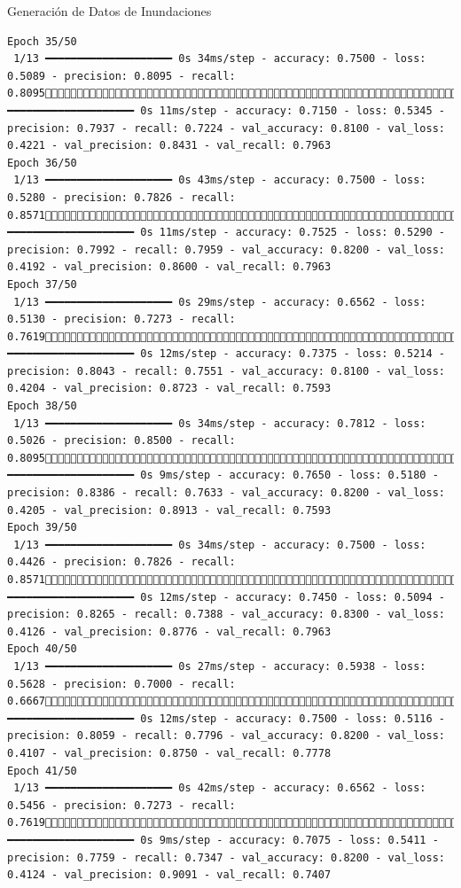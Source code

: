 \documentclass[
  ignorenonframetext,
]{beamer}
\begin{document}
\begin{frame}[fragile]{Generación de Datos de Inundaciones}
\begin{verbatim}
Epoch 35/50
 1/13 ━━━━━━━━━━━━━━━━━━━━ 0s 34ms/step - accuracy: 0.7500 - loss: 0.5089 - precision: 0.8095 - recall: 0.809513/13 ━━━━━━━━━━━━━━━━━━━━ 0s 11ms/step - accuracy: 0.7150 - loss: 0.5345 - precision: 0.7937 - recall: 0.7224 - val_accuracy: 0.8100 - val_loss: 0.4221 - val_precision: 0.8431 - val_recall: 0.7963
Epoch 36/50
 1/13 ━━━━━━━━━━━━━━━━━━━━ 0s 43ms/step - accuracy: 0.7500 - loss: 0.5280 - precision: 0.7826 - recall: 0.857113/13 ━━━━━━━━━━━━━━━━━━━━ 0s 11ms/step - accuracy: 0.7525 - loss: 0.5290 - precision: 0.7992 - recall: 0.7959 - val_accuracy: 0.8200 - val_loss: 0.4192 - val_precision: 0.8600 - val_recall: 0.7963
Epoch 37/50
 1/13 ━━━━━━━━━━━━━━━━━━━━ 0s 29ms/step - accuracy: 0.6562 - loss: 0.5130 - precision: 0.7273 - recall: 0.761913/13 ━━━━━━━━━━━━━━━━━━━━ 0s 12ms/step - accuracy: 0.7375 - loss: 0.5214 - precision: 0.8043 - recall: 0.7551 - val_accuracy: 0.8100 - val_loss: 0.4204 - val_precision: 0.8723 - val_recall: 0.7593
Epoch 38/50
 1/13 ━━━━━━━━━━━━━━━━━━━━ 0s 34ms/step - accuracy: 0.7812 - loss: 0.5026 - precision: 0.8500 - recall: 0.809513/13 ━━━━━━━━━━━━━━━━━━━━ 0s 9ms/step - accuracy: 0.7650 - loss: 0.5180 - precision: 0.8386 - recall: 0.7633 - val_accuracy: 0.8200 - val_loss: 0.4205 - val_precision: 0.8913 - val_recall: 0.7593
Epoch 39/50
 1/13 ━━━━━━━━━━━━━━━━━━━━ 0s 34ms/step - accuracy: 0.7500 - loss: 0.4426 - precision: 0.7826 - recall: 0.857113/13 ━━━━━━━━━━━━━━━━━━━━ 0s 12ms/step - accuracy: 0.7450 - loss: 0.5094 - precision: 0.8265 - recall: 0.7388 - val_accuracy: 0.8300 - val_loss: 0.4126 - val_precision: 0.8776 - val_recall: 0.7963
Epoch 40/50
 1/13 ━━━━━━━━━━━━━━━━━━━━ 0s 27ms/step - accuracy: 0.5938 - loss: 0.5628 - precision: 0.7000 - recall: 0.666713/13 ━━━━━━━━━━━━━━━━━━━━ 0s 12ms/step - accuracy: 0.7500 - loss: 0.5116 - precision: 0.8059 - recall: 0.7796 - val_accuracy: 0.8200 - val_loss: 0.4107 - val_precision: 0.8750 - val_recall: 0.7778
Epoch 41/50
 1/13 ━━━━━━━━━━━━━━━━━━━━ 0s 42ms/step - accuracy: 0.6562 - loss: 0.5456 - precision: 0.7273 - recall: 0.761913/13 ━━━━━━━━━━━━━━━━━━━━ 0s 9ms/step - accuracy: 0.7075 - loss: 0.5411 - precision: 0.7759 - recall: 0.7347 - val_accuracy: 0.8200 - val_loss: 0.4124 - val_precision: 0.9091 - val_recall: 0.7407

\end{verbatim}
\end{frame}
\end{document}
